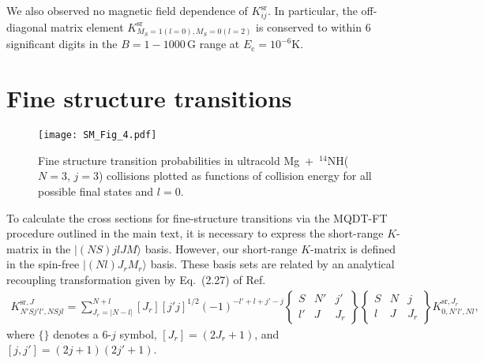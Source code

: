 \documentclass[reprint,amssymb,noeprint,twocolumn,longbibliography]{revtex4-2}
\begin{document}
We also observed no magnetic field dependence of $K_{ij}^\text{sr}$. In particular, the off-diagonal matrix element $K_{M_S=1(l=0),M_S=0(l=2)}^\text{sr}$ is conserved to within 6 significant digits in the $B=1-1000$\,G range at $E_\text{c}=10^{-6}$K.
\newline






\vspace{0.8cm}
\section{\label{sec:SM_fine} Fine structure transitions}

\begin{figure}[h!]
\begin{center}
\texttt{[image: SM\_Fig\_4.pdf]}
\end{center}
\caption{
Fine structure transition probabilities in ultracold 
 Mg~+~$^{14}$NH($N=3$, $j=3$) collisions plotted as functions of collision energy for all possible final states and $l=0$. 
}
\label{SM_Fig_4}
\end{figure}

To calculate the cross sections for fine-structure transitions  via the MQDT-FT procedure outlined in the main text, it is necessary to express the short-range $K$-matrix in
  the $|(NS)jlJM\rangle$ basis. However, our short-range $K$-matrix  is defined in the spin-free  $|(Nl)J_rM_r\rangle$ basis. These basis sets are related by an analytical recoupling transformation given by Eq.~(2.27) of Ref.~\cite{Corey_83}
\begin{equation}
\begin{split}
K^{\text{sr},J}_{N'Sj'l',NSjl} =  \sum_{J_r=|N-l|}^{N+l} [J_r][j' j]^{1/2} (-1)^{-l'+l+j'-j}   
\begin{Bmatrix} S & N' & j' \\ l' & J & J_r \end{Bmatrix} 
\begin{Bmatrix} S & N  & j  \\ l & J & J_r \end{Bmatrix}
K^{\text{sr},J_r}_{0,N'l',Nl},
\label{eq:7}
\end{split}
\end{equation}
where $\{\}$ denotes a 6-$j$ symbol, $[J_r]=(2J_r+1)$, and  $[j,j']=(2j+1)(2j'+1)$.
\end{document}
